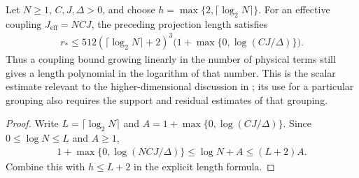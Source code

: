 \begin{lemma}
    \label{cor:hastings05_cubic_log_projection_length}
    \leanok
    Let $N\ge1$, $C,J,\Delta>0$, and choose
    $h=\max\{2,\lceil\log_2N\rceil\}$. For an effective coupling
    $J_{\mathrm{eff}}=NCJ$, the preceding projection length satisfies
    \begin{align*}
        r_*\le512(\lceil\log_2N\rceil+2)^3
        \bigl(1+\max\{0,\log(CJ/\Delta)\}\bigr).
    \end{align*}
    Thus a coupling bound growing linearly in the number of physical
    terms still gives a length polynomial in the logarithm of that number.
    This is the scalar estimate relevant to the higher-dimensional
    discussion in \cite[lines 745--756]{Hastings2006Solving}; its use for
    a particular grouping also requires the support and residual estimates
    of that grouping.
\end{lemma}
\begin{proof}\leanok
    Write $L=\lceil\log_2N\rceil$ and
    $A=1+\max\{0,\log(CJ/\Delta)\}$. Since
    $0\le\log N\le L$ and $A\ge1$,
    \begin{align*}
        1+\max\{0,\log(NCJ/\Delta)\}
        \le\log N+A\le(L+2)A.
    \end{align*}
    Combine this with $h\le L+2$ in the explicit length formula.
\end{proof}
